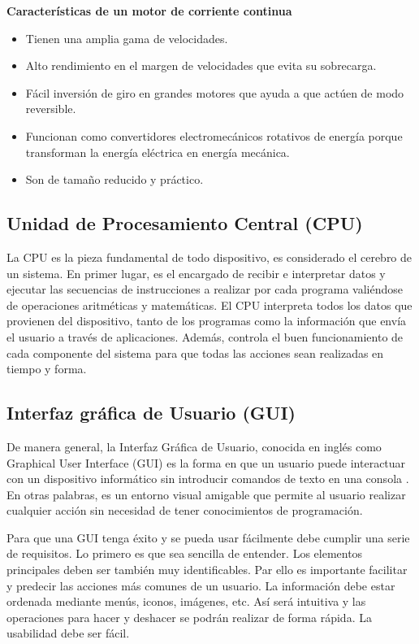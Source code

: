 \documentclass[14pt,oneside]{extarticle} %
\begin{document}
\textbf{Características de un motor de corriente continua}

\begin{itemize}
    \item Tienen una amplia gama de velocidades.
    \item Alto rendimiento en el margen de velocidades que evita su sobrecarga.
    \item Fácil inversión de giro en grandes motores que ayuda a que actúen de modo reversible.
    \item Funcionan como convertidores electromecánicos rotativos de energía porque transforman la energía eléctrica en energía mecánica.
    \item Son de tamaño reducido y práctico.
\end{itemize}

\subsection{Unidad de Procesamiento Central (CPU)}

La CPU es la pieza fundamental de todo dispositivo, es considerado el cerebro de un sistema. En primer lugar, es el encargado de recibir e interpretar datos y ejecutar las secuencias de instrucciones a realizar por cada programa valiéndose de operaciones aritméticas y matemáticas. El CPU interpreta todos los datos que provienen del dispositivo, tanto de los programas como la información que envía el usuario a través de aplicaciones. Además, controla el buen funcionamiento de cada componente del sistema para que todas las acciones sean realizadas en tiempo y forma. \cite{CPU}

\subsection{Interfaz gráfica de Usuario (GUI)}

De manera general, la Interfaz Gráfica de Usuario, conocida en inglés como Graphical User Interface (GUI) es la forma en que un usuario puede interactuar con un dispositivo informático sin introducir comandos de texto en una consola \cite{GUIFer}. En otras palabras, es un entorno visual amigable que permite al usuario realizar cualquier acción sin necesidad de tener conocimientos de programación.

Para que una GUI tenga éxito y se pueda usar fácilmente debe cumplir una serie de requisitos. Lo primero es que sea sencilla de entender. Los elementos principales deben ser también muy identificables. Par ello es importante facilitar y predecir las acciones más comunes de un usuario. La información debe estar ordenada mediante menús, iconos, imágenes, etc. Así será intuitiva y las operaciones para hacer y deshacer se podrán realizar de forma rápida. La usabilidad debe ser fácil. 
\end{document}
